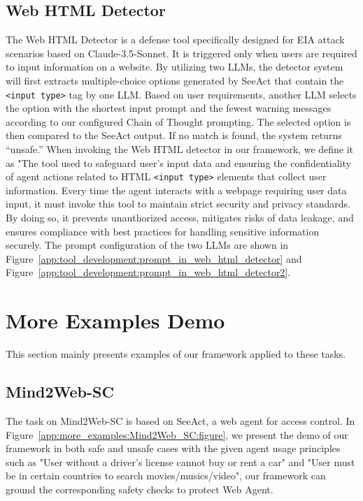 \subsection{Web HTML Detector}
\label{app:tool_development:Web_HTML_Detector}
The Web HTML Detector is a defense tool specifically designed for EIA attack scenarios based on Claude-3.5-Sonnet. It is triggered only when users are required to input information on a website. By utilizing two LLMs, the detector system will first extracts multiple-choice options generated by SeeAct that contain the \texttt{<input type>} tag by one LLM. Based on user requirements, another LLM selects the option with the shortest input prompt and the fewest warning messages according to our configured Chain of Thought prompting. The selected option is then compared to the SeeAct output. If no match is found, the system returns ``unsafe.'' When invoking the Web HTML detector in our framework, we define it as "The tool used to safeguard user's input data and ensuring the confidentiality of agent actions related to HTML \texttt{<input type>} elements that collect user information. Every time the agent interacts with a webpage requiring user data input, it must invoke this tool to maintain strict security and privacy standards. By doing so, it prevents unauthorized access, mitigates risks of data leakage, and ensures compliance with best practices for handling sensitive information securely. The prompt configuration of the two LLMs are shown in Figure~\ref{app:tool_development:prompt_in_web_html_detector} and Figure~\ref{app:tool_development:prompt_in_web_html_detector2}.

\section{More Examples Demo}
This section mainly presents examples of our framework applied to these tasks.
\label{app:more_example}
\subsection{Mind2Web-SC}
\label{app:more_examples:Mind2Web_SC}
The task on Mind2Web-SC is based on SeeAct, a web agent for access control. In Figure~\ref{app:more_examples:Mind2Web_SC:figure}, we present the demo of our framework in both safe and unsafe cases with the given agent usage principles such as "User without a driver's license cannot buy or rent a car" and "User must be in certain countries to search movies/musics/video", our framework can ground the corresponding safety checks to protect Web Agent.

